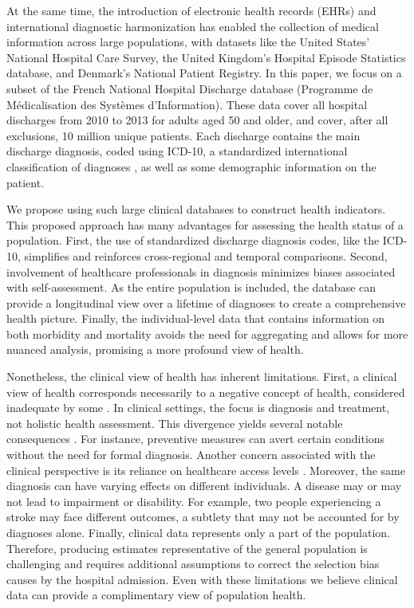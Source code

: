 \documentclass[risks,article,submit,moreauthors,pdftex]{Definitions/mdpi}
\begin{document}
At the same time, the introduction of electronic health records (EHRs)
and international diagnostic harmonization has enabled the collection of
medical information across large populations, with datasets like the
United States' National Hospital Care Survey, the United Kingdom's
Hospital Episode Statistics database, and Denmark's National Patient
Registry. In this paper, we focus on a subset of the French National
Hospital Discharge database (Programme de Médicalisation des Systèmes
d'Information). These data cover all hospital discharges from 2010 to
2013 for adults aged 50 and older, and cover, after all exclusions, 10
million unique patients. Each discharge contains the main discharge
diagnosis, coded using ICD-10, a standardized international
classification of diagnoses
\citep{world_health_organization_international_2015}, as well as some
demographic information on the patient.

We propose using such large clinical databases to construct health
indicators. This proposed approach has many advantages for assessing the
health status of a population. First, the use of standardized discharge
diagnosis codes, like the ICD-10, simplifies and reinforces
cross-regional and temporal comparisons. Second, involvement of
healthcare professionals in diagnosis minimizes biases associated with
self-assessment. As the entire population is included, the database can
provide a longitudinal view over a lifetime of diagnoses to create a
comprehensive health picture. Finally, the individual-level data that
contains information on both morbidity and mortality avoids the need for
aggregating and allows for more nuanced analysis, promising a more
profound view of health.

Nonetheless, the clinical view of health has inherent limitations.
First, a clinical view of health corresponds necessarily to a negative
concept of health, considered inadequate by some
\cite[Chapter~1]{jagger_international_2020}. In clinical settings, the
focus is diagnosis and treatment, not holistic health assessment. This
divergence yields several notable consequences
\citep{euro-reves_selection_2000}. For instance, preventive measures can
avert certain conditions without the need for formal diagnosis. Another
concern associated with the clinical perspective is its reliance on
healthcare access levels \citep{sanders_measuring_1964}. Moreover, the
same diagnosis can have varying effects on different individuals. A
disease may or may not lead to impairment or disability. For example,
two people experiencing a stroke may face different outcomes, a subtlety
that may not be accounted for by diagnoses alone. Finally, clinical data
represents only a part of the population. Therefore, producing estimates
representative of the general population is challenging and requires
additional assumptions to correct the selection bias causes by the
hospital admission. Even with these limitations we believe clinical data
can provide a complimentary view of population health.
\end{document}
